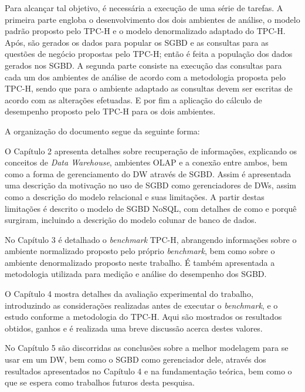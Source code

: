Para alcançar tal objetivo, é necessária a execução de uma série de tarefas. A primeira parte engloba o 
desenvolvimento dos dois ambientes de análise, o modelo padrão proposto pelo TPC-H e o modelo denormalizado adaptado do TPC-H. Após, são gerados os 
dados para popular os SGBD e as consultas para as questões de negócio propostas pelo TPC-H; então é feita a população dos dados gerados nos SGBD. 
A segunda parte consiste na execução das consultas para cada um dos ambientes de análise de acordo com a metodologia proposta pelo TPC-H, sendo que para o ambiente adaptado as consultas devem 
ser escritas de acordo com as alterações efetuadas. E por fim a aplicação do cálculo de desempenho proposto pelo TPC-H para os dois ambientes. 

A organização do documento segue da seguinte forma: 

O Capítulo 2 apresenta detalhes sobre recuperação de informações, explicando os conceitos de \textit{Data Warehouse}, ambientes OLAP e a conexão entre ambos, bem como a forma de gerenciamento do DW através de SGBD. Assim é apresentada uma descrição da motivação no uso de SGBD como gerenciadores de DWs, assim como a descrição do modelo relacional e suas limitações. A partir destas limitações é descrito o modelo de SGBD NoSQL, com detalhes de como e porquê surgiram, incluindo a descrição do modelo colunar de banco de dados.

No Capítulo 3 é detalhado o \textit{benchmark} TPC-H, abrangendo informações sobre o ambiente normalizado proposto pelo próprio \textit{benchmark}, bem como sobre o ambiente denormalizado proposto neste trabalho. É também apresentada a metodologia utilizada para medição e análise do desempenho dos SGBD.

O Capítulo 4 mostra detalhes da avaliação experimental do trabalho, introduzindo as considerações realizadas antes de executar o \textit{benchmark}, e o estudo conforme a metodologia do TPC-H. Aqui são mostrados os resultados obtidos, ganhos e é realizada uma breve discussão acerca destes valores.

No Capítulo 5 são discorridas as conclusões sobre a melhor modelagem para se usar em um DW, bem como o SGBD como gerenciador dele, através dos resultados apresentados no Capítulo 4 e na fundamentação teórica, bem como o que se espera como trabalhos futuros desta pesquisa. 